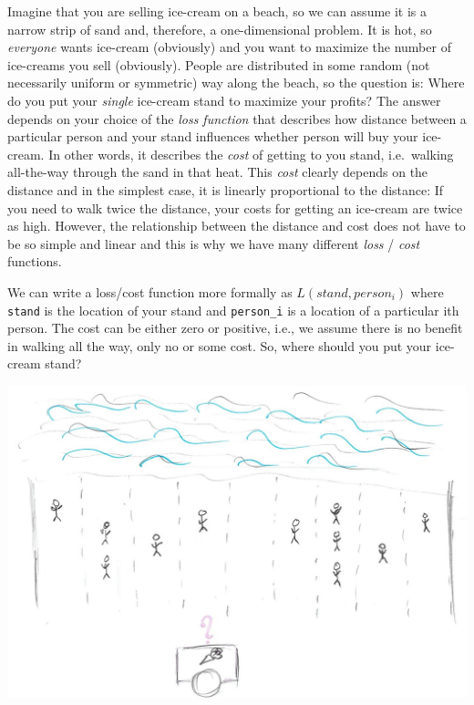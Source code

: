 \documentclass[
]{book}
\begin{document}
Imagine that you are selling ice-cream on a beach, so we can assume it is a narrow strip of sand and, therefore, a one-dimensional problem. It is hot, so \emph{everyone} wants ice-cream (obviously) and you want to maximize the number of ice-creams you sell (obviously). People are distributed in some random (not necessarily uniform or symmetric) way along the beach, so the question is: Where do you put your \emph{single} ice-cream stand to maximize your profits? The answer depends on your choice of the \emph{loss function} that describes how distance between a particular person and your stand influences whether person will buy your ice-cream. In other words, it describes the \emph{cost} of getting to you stand, i.e.~walking all-the-way through the sand in that heat. This \emph{cost} clearly depends on the distance and in the simplest case, it is linearly proportional to the distance: If you need to walk twice the distance, your costs for getting an ice-cream are twice as high. However, the relationship between the distance and cost does not have to be so simple and linear and this is why we have many different \emph{loss} / \emph{cost} functions.

We can write a loss/cost function more formally as \(L(stand, person_i)\) where \texttt{stand} is the location of your stand and \texttt{person\_i} is a location of a particular ith person. The cost can be either zero or positive, i.e., we assume there is no benefit in walking all the way, only no or some cost. So, where should you put your ice-cream stand?

\begin{center}\includegraphics[width=1\linewidth]{images/loss-functions-where-to} \end{center}
\end{document}
